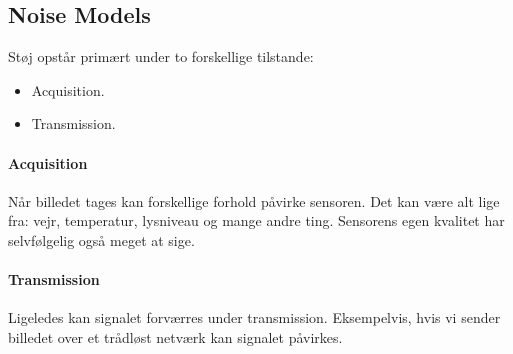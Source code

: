 \subsection{Noise Models}

Støj opstår primært under to forskellige tilstande:

\begin{itemize}
	\item Acquisition.
	\item Transmission.
\end{itemize}

\paragraph{Acquisition}

Når billedet tages kan forskellige forhold påvirke sensoren. Det kan være alt lige fra: vejr, temperatur, lysniveau og mange andre ting. Sensorens egen kvalitet har selvfølgelig også meget at sige. 

\paragraph{Transmission}

Ligeledes kan signalet forværres under transmission. Eksempelvis, hvis vi sender billedet over et trådløst netværk kan signalet påvirkes.
